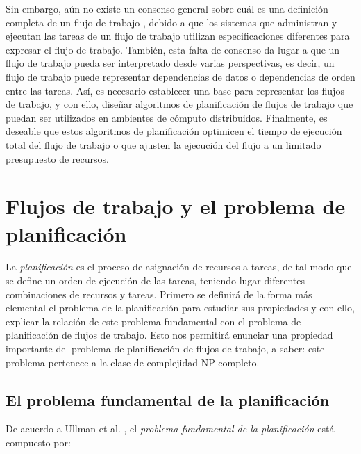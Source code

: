 Sin embargo, aún no existe un consenso general sobre cuál es una definición completa de un flujo de trabajo \cite{van2003workflow}, debido a que los sistemas que administran y ejecutan las tareas de un flujo de trabajo utilizan especificaciones diferentes para expresar el flujo de trabajo. También, esta falta de consenso da lugar a que un flujo de trabajo pueda ser interpretado desde varias perspectivas, es decir, un flujo de trabajo puede representar dependencias de datos o dependencias de orden entre las tareas. Así, es necesario establecer una base para representar los flujos de trabajo, y con ello, diseñar algoritmos de planificación de flujos de trabajo que puedan ser utilizados en ambientes de cómputo distribuidos. Finalmente, es deseable que estos algoritmos de planificación optimicen el tiempo de ejecución total del flujo de trabajo o que ajusten la ejecución del flujo a un limitado presupuesto de recursos.




\section{Flujos de trabajo y el problema de planificación} 
\label{secc:definitions}

La \emph{planificación} es el proceso de asignación de recursos a tareas, de tal modo que se define un orden de ejecución de las tareas, teniendo lugar diferentes combinaciones de recursos y tareas. Primero se definirá de la forma más elemental el problema de la planificación para estudiar sus propiedades y con ello, explicar la relación de este problema fundamental con el problema de planificación de flujos de trabajo. Esto nos permitirá enunciar una propiedad importante del problema de planificación de flujos de trabajo, a saber: este problema pertenece a la clase de complejidad NP-completo.


\subsection{El problema fundamental de la planificación}
De acuerdo a  Ullman et al. \cite{ullman1975np}, el \emph{problema fundamental de la planificación} está compuesto por:
 
